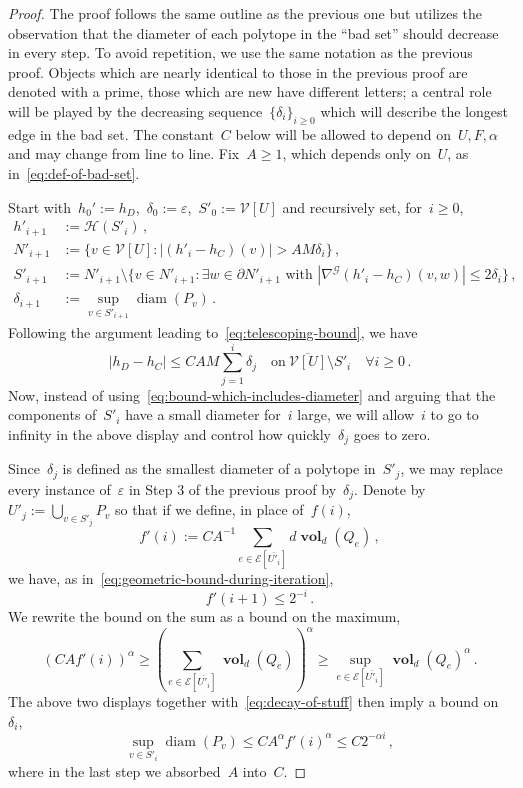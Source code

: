 \documentclass[12pt]{amsart}
\numberwithin{equation}{section}
\DeclareMathOperator{\diam}{{\mathop{diam}}}
\newcommand{\V}{\mathcal{V}}
\newcommand{\E}{\mathcal{E}}
\newcommand{\eps}{\varepsilon}
\newcommand{\Qe}{\hyperref[eq:qeset]{Q_e}}
\DeclareMathOperator{\vol}{\mathbf{vol}}
\begin{document}
\begin{proof}
	The proof follows the same outline as the previous one but utilizes the observation that the diameter of each polytope  
	in the ``bad set'' should decrease in every step. To avoid repetition, we use the same notation as the previous proof. 
	Objects which are nearly identical to those in the previous proof 
	are denoted with a prime, those which are new have different letters; a central role will be played by the decreasing
	sequence~$\{\delta_i\}_{i \geq 0}$ which will describe the longest edge in the bad set. 
	The constant~$C$ below will be allowed to depend on~$U,F,\alpha$ and may change from line to line. 
	{Fix~$A \geq 1$, which depends only on~$U$, as in~\eqref{eq:def-of-bad-set}. }
	\smallskip	



	Start with~$h_0' := h_D$,~$\delta_0 := \eps$,~$S'_0 := \V[U]$ and recursively set, for~$i \geq 0$, 
	\begin{equation}
		\label{eq:def-of-other-bad-set}
		\begin{aligned}
			h'_{i+1} &:=  \mathcal{H}(S'_{i}) \, ,   \\
			N'_{i+1} &:= \{ v \in \V[U] : |(h'_{i} - h_C)(v)| > {A M \delta_i}    \}  \, ,  \\
			S'_{i+1} &:=  N'_{i+1}  \setminus \{ v \in N'_{i+1} : \exists w \in \partial N'_{i+1} \, \, \mbox{with} \, \, |\nabla^{\mathcal{G}}(h'_i - h_C)(v,w)| \leq 2 \delta_i \}    \, , \\
			\delta_{i+1} &:= \sup_{v \in S'_{i+1}} \diam(P_v) \, . 
		\end{aligned}
	\end{equation}
	Following the argument leading to~\eqref{eq:telescoping-bound},  we have
	\begin{equation}
		\label{eq:sum-of-deltaj-bound}
		|h_D - h_C| \leq C {A} M \sum_{j=1}^{i} {\delta_j}  \quad  \mbox{on}   \ \overline{\V[U]} \setminus S'_{i}  \quad \forall i \geq 0 \, . 
	\end{equation}
	Now, instead of using~\eqref{eq:bound-which-includes-diameter} and arguing that the components of~$S'_{i}$ have a small diameter for~$i$ large, we will allow~$i$ to go to infinity in the above display
	and control how quickly~$\delta_j$ goes to zero. 
	
	Since~$\delta_j$ is defined as the smallest diameter of a polytope in~$S'_{j}$, we may replace every instance of~$\eps$ in Step 3 of the previous proof by~$\delta_j$.  Denote by~$U'_j := \bigcup_{v \in S'_{j}} P_v$ so that if we define, in place of~$f(i)$, 
	\[
	f'(i) :=  {C A^{-1}} \sum_{e \in \E[\overline{U'_i}]} d   \vol_{d}(\Qe) \, , 
	\]
	we have,  as in~\eqref{eq:geometric-bound-during-iteration}, 
	\[
	f'(i+1) \leq  {2^{-i}}  \, . 
	\]
	We rewrite the bound on the sum as a bound on the maximum,
	\[
	\left({C A} f'(i) \right)^{\alpha} \geq \left( \sum_{e \in \E[\overline{U'_i}]}  \vol_{d}(\Qe) \right)^{\alpha} \geq \sup_{e \in \E[\overline{U'_i}]} \vol_{d}(\Qe)^{\alpha} \, . 
	\]
	The above two displays together with~\eqref{eq:decay-of-stuff} then imply a bound on~$\delta_i$, 
		\[
		\sup_{v \in S'_{i}} \diam(P_v) \leq C A^{\alpha}  f'(i)^{\alpha}\leq  C 2^{-\alpha i} \, , 
		\]
		where in the last step we absorbed~$A$ into~$C$.


\end{proof}
\end{document}
